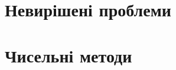 \documentclass[12pt, a4paper, openany]{book}
\begin{document}
\part{Невирішені проблеми}


\part{Чисельні методи}



\appendix




\printbibliography[heading=bibintoc]
\end{document}
